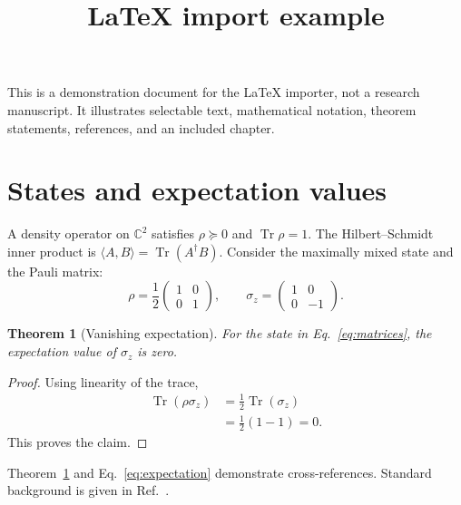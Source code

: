 \documentclass{article}
\title{LaTeX import example}
\newcommand{\Tr}{\operatorname{Tr}}
\newcommand{\C}{\mathbb{C}}
\newcommand{\inner}[2]{\langle #1,#2\rangle}
\newtheorem{theorem}{Theorem}
\begin{document}
\maketitle
This is a demonstration document for the LaTeX importer, not a research manuscript.
It illustrates selectable text, mathematical notation, theorem statements,
references, and an included chapter.

\section{States and expectation values}\label{sec:states}
A density operator on $\C^2$ satisfies $\rho\succeq0$ and $\Tr\rho=1$.
The Hilbert--Schmidt inner product is $\inner{A}{B}=\Tr(A^\dagger B)$.
Consider the maximally mixed state and the Pauli matrix:
\begin{equation}\label{eq:matrices}
\rho=\frac12\begin{pmatrix}1&0\\0&1\end{pmatrix},
\qquad \sigma_z=\begin{pmatrix}1&0\\0&-1\end{pmatrix}.
\end{equation}
\begin{theorem}[Vanishing expectation]\label{thm:expectation}
For the state in Eq.~\eqref{eq:matrices}, the expectation value of $\sigma_z$ is zero.
\end{theorem}
\begin{proof}
Using linearity of the trace,
\begin{align}\label{eq:expectation}
\Tr(\rho\sigma_z)&=\frac12\Tr(\sigma_z)\\
&=\frac12(1-1)=0.\nonumber
\end{align}
This proves the claim.
\end{proof}
Theorem~\ref{thm:expectation} and Eq.~\eqref{eq:expectation} demonstrate cross-references.
Standard background is given in Ref.~\cite{nielsen2000}.



\end{document}

